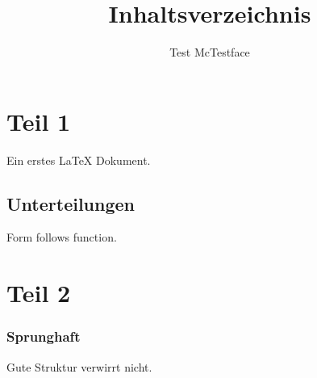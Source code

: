 \documentclass[ngerman]{scrartcl}
\title{Inhaltsverzeichnis}
\author{Test McTestface}
\begin{document}
\maketitle

\tableofcontents

\section{Teil 1}

Ein erstes \LaTeX{} Dokument.

\subsection{Unterteilungen}

Form follows function.

\section{Teil 2}

\subsubsection{Sprunghaft}

Gute Struktur verwirrt nicht.
\end{document}
